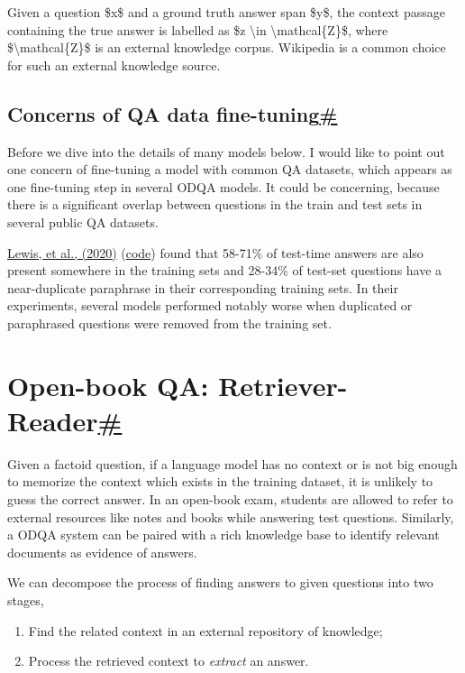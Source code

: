 Given a question \$x\$ and a ground truth answer span \$y\$, the context passage containing the true answer is labelled as \$z \textbackslash in \textbackslash mathcal\{Z\}\$, where \$\textbackslash mathcal\{Z\}\$ is an external knowledge corpus. Wikipedia is a common choice for such an external knowledge source.

\subsection{\texorpdfstring{Concerns of QA data fine-tuning\hyperref[concerns-of-qa-data-fine-tuning]{\#}}{Concerns of QA data fine-tuning\#}}\label{concerns-of-qa-data-fine-tuning}

Before we dive into the details of many models below. I would like to point out one concern of fine-tuning a model with common QA datasets, which appears as one fine-tuning step in several ODQA models. It could be concerning, because there is a significant overlap between questions in the train and test sets in several public QA datasets.

\href{https://arxiv.org/abs/2008.02637}{Lewis, et al., (2020)} (\href{https://github.com/facebookresearch/QA-Overlap}{code}) found that 58-71\% of test-time answers are also present somewhere in the training sets and 28-34\% of test-set questions have a near-duplicate paraphrase in their corresponding training sets. In their experiments, several models performed notably worse when duplicated or paraphrased questions were removed from the training set.

\section{\texorpdfstring{Open-book QA: Retriever-Reader\hyperref[open-book-qa-retriever-reader]{\#}}{Open-book QA: Retriever-Reader\#}}\label{open-book-qa-retriever-reader}

Given a factoid question, if a language model has no context or is not big enough to memorize the context which exists in the training dataset, it is unlikely to guess the correct answer. In an open-book exam, students are allowed to refer to external resources like notes and books while answering test questions. Similarly, a ODQA system can be paired with a rich knowledge base to identify relevant documents as evidence of answers.

We can decompose the process of finding answers to given questions into two stages,

\begin{enumerate}
\tightlist
\item
  Find the related context in an external repository of knowledge;
\item
  Process the retrieved context to \emph{extract} an answer.
\end{enumerate}

